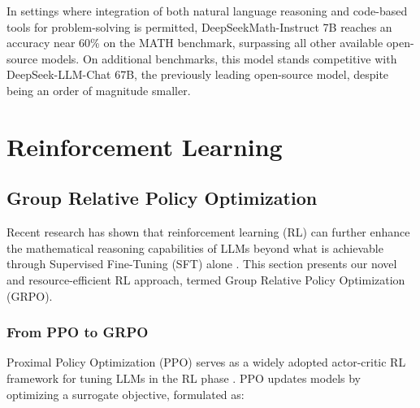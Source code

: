 In settings where integration of both natural language reasoning and code-based tools for problem-solving is permitted, DeepSeekMath-Instruct 7B reaches an accuracy near 60\% on the MATH benchmark, surpassing all other available open-source models. On additional benchmarks, this model stands competitive with DeepSeek-LLM-Chat 67B, the previously leading open-source model, despite being an order of magnitude smaller.

\section{Reinforcement Learning}

\subsection{Group Relative Policy Optimization} Recent research has shown that reinforcement learning (RL) can further enhance the mathematical reasoning capabilities of LLMs beyond what is achievable through Supervised Fine-Tuning (SFT) alone \citep{wang2023math,wizardmath}. This section presents our novel and resource-efficient RL approach, termed Group Relative Policy Optimization (GRPO).

\subsubsection{From PPO to GRPO} Proximal Policy Optimization (PPO) \citep{schulman2017proximal} serves as a widely adopted actor-critic RL framework for tuning LLMs in the RL phase \citep{ouyang2022training}. PPO updates models by optimizing a surrogate objective, formulated as:

